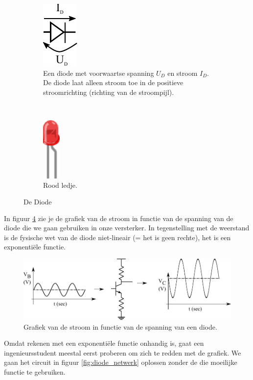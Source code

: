 \documentclass{article}
\begin{document}
			\begin{figure}[htbp]
			\centering
				\begin{subfigure}[b]{0.45\linewidth}
					\centering
					\includegraphics{diode}
					\caption{Een diode met voorwaartse spanning $U_D$ en stroom $I_D$. De diode laat alleen stroom toe in de  positieve stroomrichting (richting van de stroompijl).}
					\label{fig:diode}
				\end{subfigure}
				~
				\begin{subfigure}[b]{0.45\linewidth}
					\centering
				\includegraphics[width=0.1\textwidth]{led}
				\caption{Rood ledje.}
				\label{fig:led}
				\end{subfigure}
				\caption{De Diode}
			\end{figure}

			In figuur \ref{fig:diode_grafiek} zie je de grafiek van de stroom in functie van de spanning van de diode die we gaan gebruiken in onze versterker. In tegenstelling met de weerstand is de fysische wet van de diode niet-lineair (= het is geen rechte), het is een exponenti\"ele functie. 
				\begin{figure}[htbp]
					\centering
					\includegraphics{diode_grafiek}
					\caption{Grafiek van de stroom in functie van de spanning van een diode.}
					\label{fig:diode_grafiek}
				\end{figure}
			Omdat rekenen met een exponenti\"ele functie onhandig is, gaat een ingenieursstudent meestal eerst proberen om zich te redden met de grafiek. We gaan het circuit in figuur \ref{fig:diode_netwerk} oplossen zonder de die moeilijke functie te gebruiken.
\end{document}
